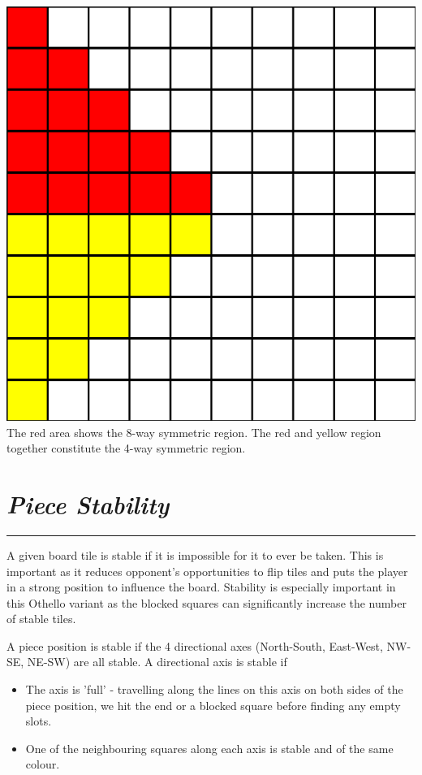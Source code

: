 \documentclass[10pt]{report}
\begin{document}
\begin{multicols}{2}
\begin{center}
\includegraphics[scale=0.25]{symmetries.png}\\
The red area shows the 8-way symmetric region. The red and yellow region together constitute the 4-way symmetric region.
\end{center}
\section*{\emph{\textmd{Piece Stability}}}
\hrule

A given board tile is stable if it is impossible for it to ever be taken. This is important as it reduces opponent's opportunities to flip tiles and puts the player in a strong position to influence the board. Stability is especially important in this Othello variant as the blocked squares can significantly increase the number of stable tiles. 

A piece position is stable if the 4 directional axes (North-South, East-West, NW-SE, NE-SW) are all stable. A directional axis is stable if
    \begin{itemize}
\item The axis is 'full' - travelling along the lines on this axis on both sides of the piece position, we hit the end or a blocked square before finding any empty slots.
\item One of the neighbouring squares along each axis is stable and of the same colour.
\end{itemize}


\end{multicols}
\end{document}
